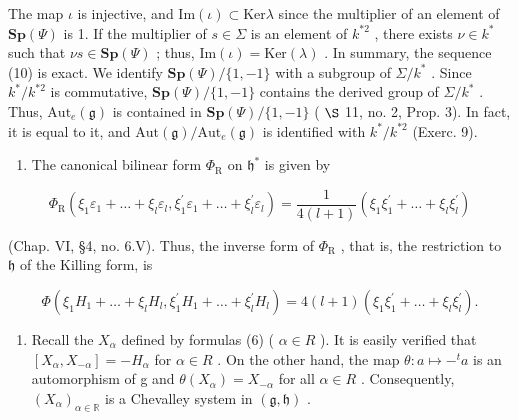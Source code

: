The map \(\iota\) is injective, and \(\mathrm{Im}(\iota) \subset \mathrm{Ker}\lambda\) since the multiplier of an element of \(\mathbf{Sp}(\varPsi)\) is 1. If the multiplier of \(s \in \varSigma\) is an element of \(k^{*2}\) , there exists \(\nu \in k^*\) such that \(\nu s \in \mathbf{Sp}(\varPsi)\) ; thus, \(\mathrm{Im}(\iota) = \mathrm{Ker}(\lambda)\) . In summary, the sequence (10) is exact. We identify \(\mathbf{Sp}(\varPsi)/\{1, -1\}\) with a subgroup of \(\varSigma/k^*\) . Since \(k^*/k^{*2}\) is commutative, \(\mathbf{Sp}(\varPsi)/\{1, -1\}\) contains the derived group of \(\varSigma/k^*\) . Thus, \(\mathrm{Aut}_e(\mathfrak{g})\) is contained in \(\mathbf{Sp}(\varPsi)/\{1, -1\}\) ( \(\S\) 11, no. 2, Prop. 3). In fact, it is equal to it, and \(\mathrm{Aut}(\mathfrak{g})/\mathrm{Aut}_e(\mathfrak{g})\) is identified with \(k^*/k^{*2}\) (Exerc. 9).

\begin{enumerate}
\def\labelenumi{(\Roman{enumi})}
\setcounter{enumi}{7}
\tightlist
\item
  The canonical bilinear form \(\Phi_{\mathrm{R}}\) on \(\mathfrak{h}^*\) is given by
\end{enumerate}

\[
\varPhi_ {\mathrm{R}} (\xi_ {1} \varepsilon_ {1} + \dots + \xi_ {l} \varepsilon_ {l}, \xi_ {1} ^ {\prime} \varepsilon_ {1} + \dots + \xi_ {l} ^ {\prime} \varepsilon_ {l}) = \frac {1}{4 (l + 1)} (\xi_ {1} \xi_ {1} ^ {\prime} + \dots + \xi_ {l} \xi_ {l} ^ {\prime})
\]

(Chap. VI, §4, no. 6.V). Thus, the inverse form of \(\varPhi_{\mathrm{R}}\) , that is, the restriction to \(\mathfrak{h}\) of the Killing form, is

\[
\Phi (\xi_ {1} H _ {1} + \dots + \xi_ {l} H _ {l}, \xi_ {1} ^ {\prime} H _ {1} + \dots + \xi_ {l} ^ {\prime} H _ {l}) = 4 (l + 1) (\xi_ {1} \xi_ {1} ^ {\prime} + \dots + \xi_ {l} \xi_ {l} ^ {\prime}).
\]

\begin{enumerate}
\def\labelenumi{(\Roman{enumi})}
\setcounter{enumi}{8}
\tightlist
\item
  Recall the \(X_{\alpha}\) defined by formulas (6) ( \(\alpha \in R\) ). It is easily verified that \([X_{\alpha}, X_{-\alpha}] = -H_{\alpha}\) for \(\alpha \in R\) . On the other hand, the map \(\theta : a \mapsto -^{t}a\) is an automorphism of g and \(\theta(X_{\alpha}) = X_{-\alpha}\) for all \(\alpha \in R\) . Consequently, \((X_{\alpha})_{\alpha \in \mathbb{R}}\) is a Chevalley system in \((\mathfrak{g}, \mathfrak{h})\) .
\end{enumerate}

